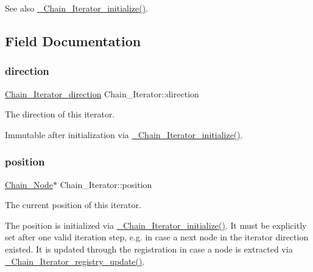 \begin{DoxySeeAlso}{See also}
\mbox{\hyperlink{group__RTEMSScoreChain_gafab713cc67440572b20e0d853163d626}{\+\_\+\+Chain\+\_\+\+Iterator\+\_\+initialize()}}. 
\end{DoxySeeAlso}


\subsection{Field Documentation}
\mbox{\label{structChain__Iterator_ae816012b95f6ee7b0eff2f33bb9dfb86}} 
\subsubsection{\texorpdfstring{direction}{direction}}
{\footnotesize\ttfamily \mbox{\hyperlink{group__RTEMSScoreChain_gac754c64a6c8a46b7b17cf3b7ac33124b}{Chain\+\_\+\+Iterator\+\_\+direction}} Chain\+\_\+\+Iterator\+::direction}



The direction of this iterator. 

Immutable after initialization via \mbox{\hyperlink{group__RTEMSScoreChain_gafab713cc67440572b20e0d853163d626}{\+\_\+\+Chain\+\_\+\+Iterator\+\_\+initialize()}}. \mbox{\label{structChain__Iterator_a07a586990a24be3df71be20d64e5d2fc}} 
\subsubsection{\texorpdfstring{position}{position}}
{\footnotesize\ttfamily \mbox{\hyperlink{group__RTEMSScoreChain_ga0dd4bfcca1ac7f90de2842e447846d3d}{Chain\+\_\+\+Node}}$\ast$ Chain\+\_\+\+Iterator\+::position}



The current position of this iterator. 

The position is initialized via \mbox{\hyperlink{group__RTEMSScoreChain_gafab713cc67440572b20e0d853163d626}{\+\_\+\+Chain\+\_\+\+Iterator\+\_\+initialize()}}. It must be explicitly set after one valid iteration step, e.\+g. in case a next node in the iterator direction existed. It is updated through the registration in case a node is extracted via \mbox{\hyperlink{group__RTEMSScoreChain_gab41311aebb8f4e50ff8e75516d5245e6}{\+\_\+\+Chain\+\_\+\+Iterator\+\_\+registry\+\_\+update()}}. \mbox{\label{structChain__Iterator_acc2772c86c2f2102345a967b0d111df0}} 
